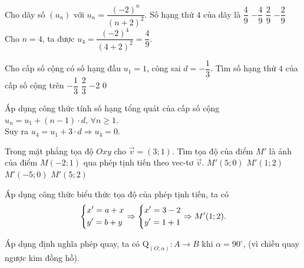 \begin{ex}%
	Cho dãy số $(u_n)$ với $u_n=\dfrac{(-2)^n}{(n+2)^2}$. Số hạng thứ $4$ của dãy là
		\choice
	{\True $\dfrac{4}{9}$}
	{$-\dfrac{4}{9}$}
	{$\dfrac{2}{9}$}
	{$-\dfrac{2}{9}$}
	\loigiai
	{ Cho $n=4$, ta được $u_4=\dfrac{(-2)^4}{(4+2)^2}=\dfrac{4}{9}.$
	}
\end{ex}

\begin{ex}%
	Cho cấp số cộng có số hạng đầu $u_1=1$, công sai $d=-\dfrac{1}{3}$. Tìm số hạng thứ $4$ của cấp số cộng trên
		\choice
	{$-\dfrac{1}{3}$}
	{$\dfrac{2}{3}$}
	{$-2$}
	{\True $0$}
	\loigiai
	{ Áp dụng công thức tính số hạng tổng quát của cấp số cộng $u_n=u_1+(n-1)\cdot d, \, \forall n\geq 1$.\\ Suy ra $u_4=u_1+3\cdot d \Rightarrow u_4=0$.
		
	}
\end{ex}

\begin{ex}%
	Trong mặt phẳng tọa độ $Oxy$ cho $\vec{v}=(3;1)$. Tìm tọa độ của điểm $M'$ là ảnh của điểm $M(-2;1)$ qua phép tịnh tiến theo vec-tơ $\vec{v}$.
		\choice
	{$M'(5;0)$}
	{\True $M'(1;2)$}
	{$M'(-5;0)$}
	{$M'(5;2)$}
	\loigiai
	{ Áp dụng công thức biểu thức tọa độ của phép tịnh tiến, ta có $$\left\{\begin{aligned}&x'=a+x\\&y'=b+y\end{aligned}\right. \Rightarrow \left\{\begin{aligned}&x'=3-2\\&y'=1+1\end{aligned}\right. \Rightarrow M'(1;2).$$ 
		
	}
\end{ex}

\begin{ex}%
	\loigiai
	{ Áp dụng định nghĩa phép quay, ta có $\mathrm{Q}_{(O;\alpha)}\colon A \longrightarrow B$ khi $\alpha =90^\circ$, (vì chiều quay ngược kim đồng hồ).
		
	}
\end{ex}


